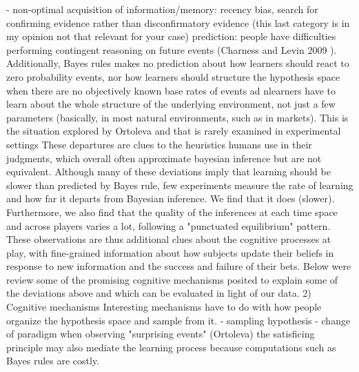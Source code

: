 {- non-optimal acquisition of information/memory: recency bias, search for confirming evidence rather than disconfirmatory evidence (this last category is in my opinion not that relevant for your case) prediction: people have difficulties performing contingent reasoning on future events (Charness and Levin 2009 \cite{charness2009origin}). Additionally, Bayes rules makes no prediction about how learners should react to zero probability events, nor how learners should structure the hypothesis space when there are no objectively known base rates of events ad nlearners have to learn about the whole structure of the underlying environment, not just a few parameters (basically, in most natural environments, such as in markets). This is the situation explored by Ortoleva \cite{ortoleva2012modeling} and that is rarely examined in experimental settings  These departures are clues to the heuristics humans use in their judgments, which overall often approximate bayesian inference but are not equivalent. Although many of these deviations imply that learning should be slower than predicted by Bayes rule,  few experiments measure the rate of learning and how far it departs from Bayesian inference. We find that it does (slower). Furthermore, we also find that the quality of the inferences at each time space and across players varies a lot, following a "punctuated equilibrium" pattern. These observations are thus additional clues about the cognitive processes at play, with fine-grained information about how subjects update their beliefs in response to new information and the success and failure of their bets. Below were review some of the promising cognitive mechanisms posited to explain some of the deviations above and which can be evaluated in light of our data. 2) Cognitive mechanisms  Interesting mechanisms have to do with how people organize the hypothesis space and sample from it.  - sampling hypothesis - change of paradigm when observing "surprising events" (Ortoleva) \cite{ortoleva2012modeling} the satisficing principle may also mediate the learning process because computations such as Bayes rules are costly.
}
